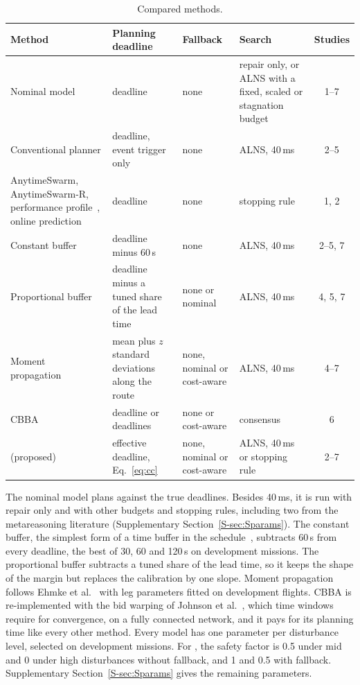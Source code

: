 \begin{table}[t]
\caption{Compared methods.}\label{tab:methods}
\centering\footnotesize
\setlength{\tabcolsep}{4pt}
\begin{tabular}{@{}>{\raggedright\arraybackslash}p{3.8cm}>{\raggedright\arraybackslash}p{4.6cm}%
>{\raggedright\arraybackslash}p{2.8cm}>{\raggedright\arraybackslash}p{4.1cm}c@{}}
\toprule
Method & Planning deadline & Fallback & Search & Studies \\
\midrule
Nominal model~\cite{ropke2006adaptive} & deadline & none & repair only, or ALNS with a fixed, scaled or stagnation budget & 1--7 \\
Conventional planner & deadline, event trigger only & none & ALNS, 40\,ms & 2--5 \\
AnytimeSwarm, AnytimeSwarm-R, performance profile~\cite{boddy1994deliberation,zilberstein1996using}, online prediction~\cite{svegliato2018meta} & deadline & none & stopping rule & 1, 2 \\
Constant buffer~\cite{jabali2015selfimposed} & deadline minus 60\,s & none & ALNS, 40\,ms & 2--5, 7 \\
Proportional buffer & deadline minus a tuned share of the lead time & none or nominal & ALNS, 40\,ms & 4, 5, 7 \\
Moment propagation~\cite{ehmke2015ensuring} & mean plus $z$ standard deviations along the route & none, nominal or cost-aware & ALNS, 40\,ms & 4--7 \\
CBBA~\cite{choi2009consensus,johnson2012nonsubmodular} & deadline or \mname{} deadlines & none or cost-aware & consensus & 6 \\
\mname{} (proposed) & effective deadline, Eq.~\eqref{eq:cc} & none, nominal or cost-aware & ALNS, 40\,ms or stopping rule & 2--7 \\
\bottomrule
\end{tabular}
\end{table}

The nominal model plans against the true deadlines. Besides 40\,ms, it is run with repair only and with other budgets
and stopping rules, including two from the metareasoning literature (Supplementary Section~\ref{S-sec:Sparams}). The
constant buffer, the simplest form of a time buffer in the
schedule~\cite{jabali2015selfimposed}, subtracts 60\,s from every deadline, the best of 30, 60 and 120\,s on
development missions. The proportional buffer subtracts a tuned share of the
lead time, so it keeps the shape of the \mname{} margin but replaces the calibration by one slope. Moment propagation
follows Ehmke et al.~\cite{ehmke2015ensuring} with leg parameters fitted on development flights. CBBA is
re-implemented with the bid warping of Johnson et al.~\cite{johnson2012nonsubmodular}, which time windows require for
convergence, on a fully connected network, and it pays for its planning time like every other method. Every model has
one parameter per disturbance level, selected on development missions. For \mname{}, the safety factor is 0.5 under
mid and 0 under high disturbances without fallback, and 1 and 0.5 with fallback. Supplementary
Section~\ref{S-sec:Sparams} gives the remaining parameters.

